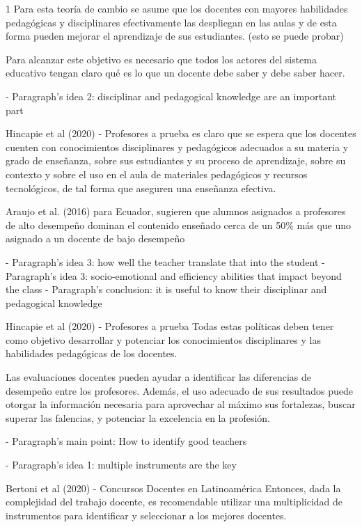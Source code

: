 1 Para esta teoría de cambio se asume que los docentes con mayores habilidades pedagógicas y disciplinares efectivamente las despliegan en las aulas y de esta forma pueden mejorar el aprendizaje de sus estudiantes.
(esto se puede probar)


Para alcanzar este objetivo es necesario que todos los actores del sistema educativo tengan claro qué es lo que un docente debe saber y debe saber hacer.


- Paragraph's idea 2: disciplinar and pedagogical knowledge are an important part

Hincapie et al (2020) - Profesores a prueba
es claro que se espera que los docentes cuenten con conocimientos disciplinares y pedagógicos adecuados a su materia y grado de enseñanza, sobre sus estudiantes y su proceso de aprendizaje, sobre su contexto y sobre el uso en el aula de materiales pedagógicos y recursos tecnológicos, de tal forma que aseguren una enseñanza efectiva.

Araujo et al. (2016) para Ecuador, sugieren que alumnos asignados a profesores de alto desempeño dominan el contenido enseñado cerca de un 50\% más que uno asignado a un docente de bajo desempeño


- Paragraph's idea 3: how well the teacher translate that into the student
- Paragraph's idea 3: socio-emotional and efficiency abilities that impact beyond the class
- Paragraph's conclusion: it is useful to know their disciplinar and pedagogical knowledge 

Hincapie et al (2020) - Profesores a prueba
Todas estas políticas deben tener como objetivo desarrollar y potenciar los conocimientos disciplinares y las habilidades pedagógicas de los docentes. 

Las evaluaciones docentes pueden ayudar a identificar las diferencias de desempeño entre los profesores. Además, el uso adecuado de sus resultados puede otorgar la información necesaria para aprovechar al máximo sus fortalezas, buscar superar las falencias, y potenciar la excelencia en la profesión.




- Paragraph's main point: How to identify good teachers

- Paragraph's idea 1: multiple instruments are the key

Bertoni et al (2020) - Concursos Docentes en Latinoamérica
Entonces, dada la complejidad del trabajo docente, es recomendable utilizar una multiplicidad de instrumentos para identificar y seleccionar a los mejores docentes.

